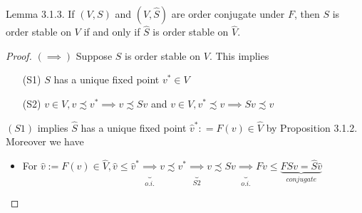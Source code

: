 \begin{frame}{Lemma 3.1.3.}
If $(V,S)$ and $(\hat V,\hat S)$ are order conjugate under $F$, then $S$ is order stable on $V$ if and only if $\hat S$ is order stable on $\hat V$.
\begin{proof}
    $(\implies)$ Suppose $S$ is order stable on $V$. This implies
    \begin{itemize}
        \item[(S1)] $S$ has a unique fixed point $v^*\in V$
        \item[(S2)] $v\in V, v\precsim v^*\implies v\precsim Sv$ and $v\in V, v^*\precsim v\implies Sv\precsim v$
    \end{itemize}
    $(S1)$ implies $\hat S$ has a unique fixed point $\hat v^* : =F(v)\in \hat V$ by Proposition 3.1.2. Moreover we have
    \begin{itemize}
        \item For $\hat v:= F(v)\in \hat V, \hat v\le \hat v^*\underbrace{\implies}_{o.i.} v\precsim v^*\underbrace{\implies}_{S2} v\precsim Sv\underbrace{\implies}_{o.i.}Fv\le \underbrace{FSv = \hat S\hat v}_{conjugate}$
        
    \end{itemize}
    
    
\end{proof}
    
\end{frame}